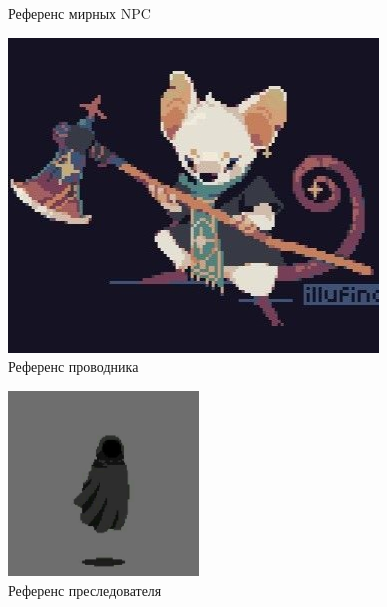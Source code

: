 \documentclass{article}
\begin{document}
\begin{itemize}
\begin{figure}[h]
\begin{minipage}{0.4\textwidth}
				\caption{Референс мирных NPC}
				\label{fig:civilians}
			\end{minipage}
			\hfill
			\begin{minipage}{0.4\textwidth}
				\centering
				\includegraphics[width=\textwidth]{images/sage.jpg}
				\caption{Референс проводника}
				\label{fig:sage}
			\end{minipage}
		\end{figure}
		\begin{figure}[h]
			\centering
			\includegraphics[width=0.45\textwidth]{images/shadow.jpg}
			\caption{Референс преследователя}
			\label{fig:shadow}
		\end{figure}
		\newpage
		

\end{itemize}
\end{document}
